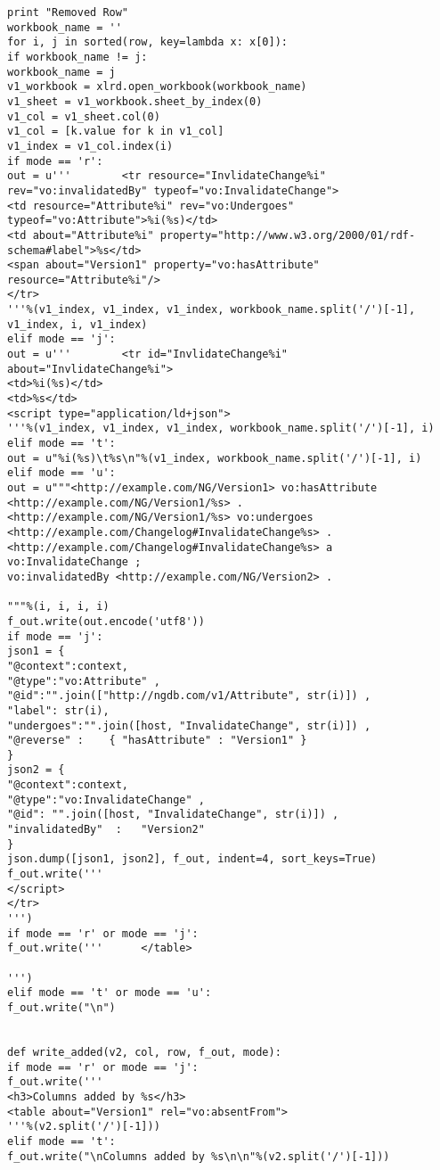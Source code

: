 \begin{verbatim}
print "Removed Row"
workbook_name = ''
for i, j in sorted(row, key=lambda x: x[0]):
if workbook_name != j:
workbook_name = j
v1_workbook = xlrd.open_workbook(workbook_name)
v1_sheet = v1_workbook.sheet_by_index(0)
v1_col = v1_sheet.col(0)
v1_col = [k.value for k in v1_col]
v1_index = v1_col.index(i)
if mode == 'r':
out = u'''        <tr resource="InvlidateChange%i" rev="vo:invalidatedBy" typeof="vo:InvalidateChange">
<td resource="Attribute%i" rev="vo:Undergoes" typeof="vo:Attribute">%i(%s)</td>
<td about="Attribute%i" property="http://www.w3.org/2000/01/rdf-schema#label">%s</td>
<span about="Version1" property="vo:hasAttribute" resource="Attribute%i"/>
</tr>
'''%(v1_index, v1_index, v1_index, workbook_name.split('/')[-1], v1_index, i, v1_index)
elif mode == 'j':
out = u'''        <tr id="InvlidateChange%i" about="InvlidateChange%i">
<td>%i(%s)</td>
<td>%s</td>
<script type="application/ld+json">
'''%(v1_index, v1_index, v1_index, workbook_name.split('/')[-1], i)
elif mode == 't':
out = u"%i(%s)\t%s\n"%(v1_index, workbook_name.split('/')[-1], i)
elif mode == 'u':
out = u"""<http://example.com/NG/Version1> vo:hasAttribute <http://example.com/NG/Version1/%s> .
<http://example.com/NG/Version1/%s> vo:undergoes <http://example.com/Changelog#InvalidateChange%s> .
<http://example.com/Changelog#InvalidateChange%s> a vo:InvalidateChange ;
vo:invalidatedBy <http://example.com/NG/Version2> .

"""%(i, i, i, i)
f_out.write(out.encode('utf8'))
if mode == 'j':
json1 = {
"@context":context,
"@type":"vo:Attribute" ,
"@id":"".join(["http://ngdb.com/v1/Attribute", str(i)]) ,
"label": str(i),
"undergoes":"".join([host, "InvalidateChange", str(i)]) ,
"@reverse" :    { "hasAttribute" : "Version1" }
}
json2 = {
"@context":context,
"@type":"vo:InvalidateChange" ,
"@id": "".join([host, "InvalidateChange", str(i)]) ,
"invalidatedBy"  :   "Version2"
}
json.dump([json1, json2], f_out, indent=4, sort_keys=True)
f_out.write('''
</script>
</tr>
''')
if mode == 'r' or mode == 'j':
f_out.write('''      </table>

''')
elif mode == 't' or mode == 'u':
f_out.write("\n")


def write_added(v2, col, row, f_out, mode):
if mode == 'r' or mode == 'j':
f_out.write('''
<h3>Columns added by %s</h3>
<table about="Version1" rel="vo:absentFrom">
'''%(v2.split('/')[-1]))
elif mode == 't':
f_out.write("\nColumns added by %s\n\n"%(v2.split('/')[-1]))


\end{verbatim}
